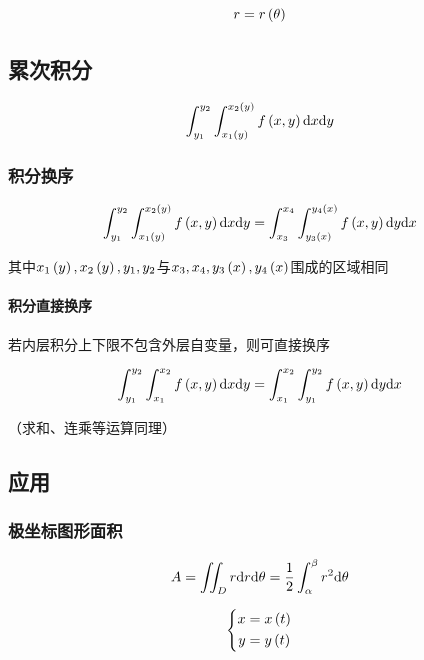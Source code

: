 \documentclass{article}
\begin{document}
\begin{definition}[以下极坐标方程中都有]
    \[r=r\left(\theta\right)\]
\end{definition}

\subsection{累次积分}

\begin{definition}[例：二次积分]
    \[\int_{y_1}^{y_2}\int_{x_1\left(y\right)}^{x_2\left(y\right)}f\left(x,y\right)\mathrm d x\mathrm d y\]
\end{definition}

\subsubsection{积分换序}

\[\int_{y_1}^{y_2}\int_{x_1\left(y\right)}^{x_2\left(y\right)}f\left(x,y\right)\mathrm d x\mathrm d y=\int_{x_3}^{x_4}\int_{y_3\left(x\right)}^{y_4\left(x\right)}f\left(x,y\right)\mathrm d y\mathrm d x\]

其中$x_1\left(y\right),x_2\left(y\right),y_1,y_2$与$x_3,x_4,y_3\left(x\right),y_4\left(x\right)$围成的区域相同

\paragraph{积分直接换序}

若内层积分上下限不包含外层自变量，则可直接换序

\[\int_{y_1}^{y_2}\int_{x_1}^{x_2}f\left(x,y\right)\mathrm d x\mathrm d y=\int_{x_1}^{x_2}\int_{y_1}^{y_2}f\left(x,y\right)\mathrm d y\mathrm d x\]

（求和、连乘等运算同理）

\subsection{应用}

\subsubsection{极坐标图形面积}

\[A=\iint_Dr\mathrm d r\mathrm d\theta=\frac12\int_{\alpha}^{\beta}{r^2\mathrm d\theta}\]

\begin{definition}
    \[\left\{\begin{aligned}
            x & =x\left(t\right) \\
            y & =y\left(t\right)
        \end{aligned}\right.\]
\end{definition}
\end{document}
